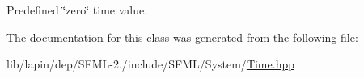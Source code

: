 Predefined \char`\"{}zero\char`\"{} time value. 



The documentation for this class was generated from the following file\-:\begin{DoxyCompactItemize}
\item 
lib/lapin/dep/\-S\-F\-M\-L-\/2./include/\-S\-F\-M\-L/\-System/\hyperlink{lapin_2dep_2_s_f_m_l-2_83_2include_2_s_f_m_l_2_system_2_time_8hpp}{Time.\-hpp}\end{DoxyCompactItemize}
